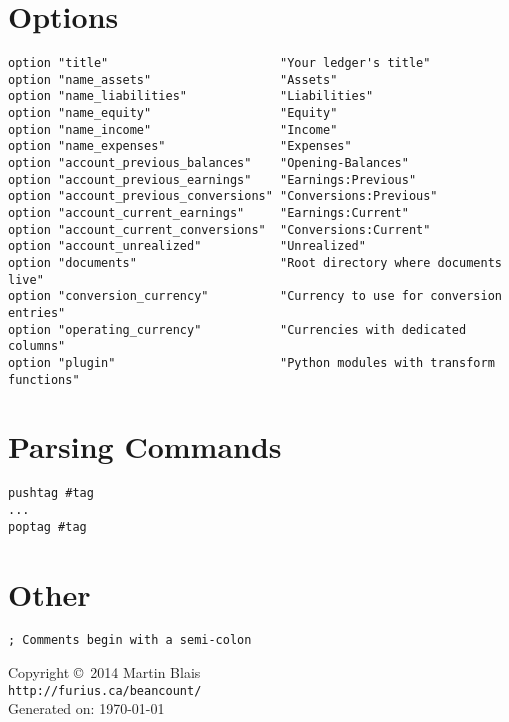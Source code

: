 \documentclass[10pt,landscape]{article}
\begin{document}
\begin{multicols}{2}
\section{Options}
\begin{verbatim}
option "title"                        "Your ledger's title"
option "name_assets"                  "Assets"
option "name_liabilities"             "Liabilities"
option "name_equity"                  "Equity"
option "name_income"                  "Income"
option "name_expenses"                "Expenses"
option "account_previous_balances"    "Opening-Balances"
option "account_previous_earnings"    "Earnings:Previous"
option "account_previous_conversions" "Conversions:Previous"
option "account_current_earnings"     "Earnings:Current"
option "account_current_conversions"  "Conversions:Current"
option "account_unrealized"           "Unrealized"
option "documents"                    "Root directory where documents live"
option "conversion_currency"          "Currency to use for conversion entries"
option "operating_currency"           "Currencies with dedicated columns"
option "plugin"                       "Python modules with transform functions"
\end{verbatim}



\section{Parsing Commands}
\begin{verbatim}
pushtag #tag
...
poptag #tag
\end{verbatim}



\section{Other}
\begin{verbatim}
; Comments begin with a semi-colon
\end{verbatim}



\scriptsize
\begin{center}
  Copyright \copyright\ 2014 Martin Blais \\
  \texttt{http://furius.ca/beancount/} \\
  Generated on: \today
\end{center}
\end{multicols}
\end{document}

